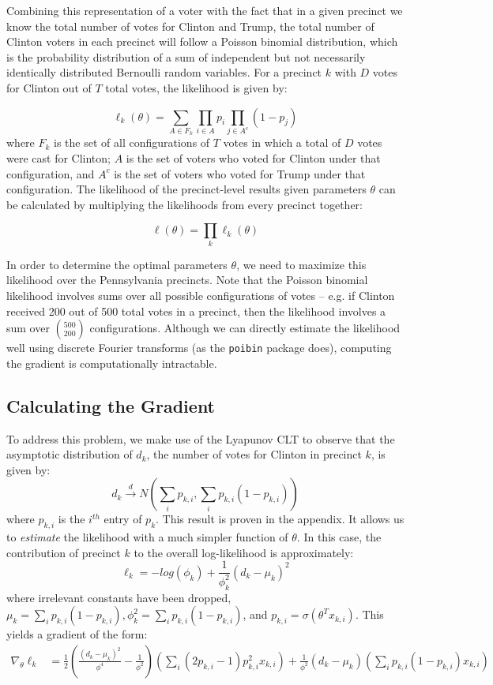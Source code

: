 \documentclass[10pt, letterpaper]{article}
\begin{document}
Combining this representation of a voter with the fact that in a given precinct we know the total number of votes for Clinton and Trump, the total number of Clinton voters in each precinct will follow a Poisson binomial distribution, which is the probability distribution of a sum of independent but not necessarily identically distributed Bernoulli random variables\cite{Poibi}. For a precinct $k$ with $D$ votes for Clinton out of $T$ total votes, the likelihood is given by:

$$\ell_k(\theta) = \sum_{A \in F_k} \prod_{i \in A} p_i \prod_{j \in A^c}(1 - p_j)$$
where $F_k$ is the set of all configurations of $T$ votes in which a total of $D$ votes were cast for Clinton; $A$ is the set of voters who voted for Clinton under that configuration, and $A^c$ is the set of voters who voted for Trump under that configuration. The likelihood of the precinct-level results given parameters $\theta$ can be calculated by multiplying the likelihoods from every precinct together:

$$\ell(\theta) = \prod_k \ell_k(\theta)$$

In order to determine the optimal parameters $\theta$, we need to maximize this likelihood over the Pennsylvania precincts. Note that the Poisson binomial likelihood involves sums over all possible configurations of votes -- e.g. if Clinton received 200 out of 500 total votes in a precinct, then the likelihood involves a sum over $500 \choose 200$ configurations. Although we can directly estimate the likelihood well using discrete Fourier transforms (as the \texttt{poibin} package does\cite{PoibiGithub}), computing the gradient is computationally intractable.

\subsection{Calculating the Gradient}

To address this problem, we make use of the Lyapunov CLT to observe that the asymptotic distribution of $d_k$, the number of votes for Clinton in precinct $k$, is given by: 
\[ d_k \stackrel{d} \longrightarrow N \left(\sum_{i} p_{k,i}, \sum_{i} p_{k, i}(1-p_{k, i}) \right) \] 
where $p_{k, i}$ is the $i^{th}$ entry of $p_k$. This result is proven in the appendix. It allows us to \emph{estimate} the likelihood with a much simpler function of $\theta$. In this case, the contribution of precinct $k$ to the overall log-likelihood is approximately: 
\[ \ell_k = -log \left( \phi_k\right) + \frac{1}{\phi_k^2} \left( d_k -\mu_k \right)^2  \] 
where irrelevant constants have been dropped, $\mu_k =  \sum_{i} p_{k, i}(1-p_{k, i}), \phi_k^2 = \sum_{i} p_{k, i}(1-p_{k, i})$, and $p_{k, i} = \sigma(\theta^T x_{k, i})$. This yields a gradient of the form: 
\begin{align*}
\nabla_{\theta} \ell_k &=  \frac{1}{2} \left(\frac{(d_k - \mu_k)^2}{\phi^4} - \frac{1}{\phi^2} \right) \left( \sum_{i} (2 p_{k, i} - 1)p_{k, i}^2 x_{k, i} \right) + \frac{1}{\phi^2} (d_k - \mu_k) \left( \sum_i p_{k, i} (1 - p_{k, i}) x_{k, i} \right)
\end{align*}
\end{document}
